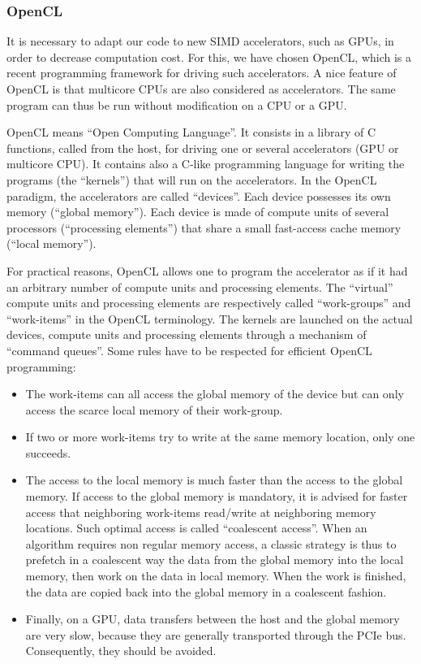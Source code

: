 \documentclass[preprint]{sig-alternate}
\begin{document}
\subsubsection{OpenCL}
It is necessary to adapt our code to new SIMD accelerators, such as GPUs, in order to decrease computation cost. For this, we have chosen OpenCL, which is a recent programming framework for driving such accelerators. A nice feature of OpenCL is that multicore CPUs are also considered as accelerators. The same program can thus be run without modification on a CPU or a GPU.

OpenCL means ``Open Computing Language''. It consists in a library of C functions, called from the host, for driving one or several accelerators (GPU or multicore CPU). It contains also a C-like programming language for writing the programs (the ``kernels'') that will run on the accelerators. In the OpenCL paradigm, the accelerators are called ``devices''. Each device possesses its own memory (``global memory''). Each device is made of compute units of several processors (``processing elements'') that share a small fast-access cache memory (``local memory'').

For practical reasons, OpenCL allows one to program the accelerator as if it had an arbitrary number of compute units and processing elements. The ``virtual'' compute units and processing elements are respectively called ``work-groups'' and ``work-items'' in the OpenCL terminology.  The kernels are launched on the actual devices, compute units and processing elements through a mechanism of ``command queues''. Some rules have to be respected for efficient OpenCL programming:
\begin{itemize}
\item  The work-items can all access the global memory of the device but can only access the scarce local memory of their work-group.
\item If two or more work-items try to write at the same memory location, only one succeeds.
\item The access to the local memory is much faster than the access to the global memory. If access to the global memory is mandatory, it is advised for faster access that neighboring work-items read/write at neighboring memory locations. Such optimal access is called ``coalescent access''. When an algorithm requires non regular memory access, a classic strategy is thus to prefetch in a coalescent way the data from the global memory into the local memory, then work on the data in local memory. When the work is finished, the data are copied back into the global memory in a coalescent fashion.
\item Finally, on a GPU, data transfers between the host and the global memory are very slow, because they are generally transported through the PCIe bus. Consequently, they should be avoided.
\end{itemize}
\end{document}
